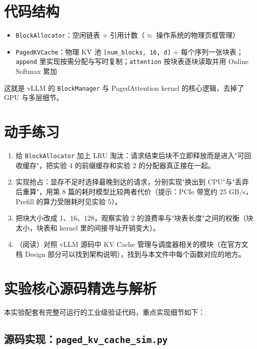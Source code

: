 \section{代码结构}

\begin{itemize}
  \item \texttt{BlockAllocator}：空闲链表 + 引用计数（$\approx$ 操作系统的物理页框管理）
  \item \texttt{PagedKVCache}：物理 KV 池 \texttt{[num\_blocks, 16, d]} + 每个序列一张块表；\texttt{append} 里实现按需分配与写时复制；\texttt{attention} 按块表逐块读取并用 Online Softmax 累加
\end{itemize}

这就是 vLLM 的 \texttt{BlockManager} 与 PagedAttention kernel 的核心逻辑，去掉了 GPU 与多层细节。

\section{动手练习}

\begin{enumerate}
  \item 给 \texttt{BlockAllocator} 加上 LRU 淘汰：请求结束后块不立即释放而是进入"可回收缓存"，把实验 4 的前缀缓存和实验 2 的分配器真正接在一起。
  \item 实现抢占：显存不足时选择最晚到达的请求，分别实现"换出到 CPU"与"丢弃后重算"，用第 8 篇的耗时模型比较两者代价（提示：PCIe 带宽约 25 GB/s，Prefill 的算力受限耗时见实验 5）。
  \item 把块大小改成 1、16、128，观察实验 2 的浪费率与"块表长度"之间的权衡（块太小，块表和 kernel 里的间接寻址开销变大）。
  \item （阅读）对照 vLLM 源码中 KV Cache 管理与调度器相关的模块（在官方文档 Design 部分可以找到架构说明），找到与本文件中每个函数对应的地方。
\end{enumerate}



\section{实验核心源码精选与解析}

本实验配套有完整可运行的工业级验证代码，重点实现细节如下：


\subsection{源码实现：\texttt{paged\_kv\_cache\_sim.py}}




